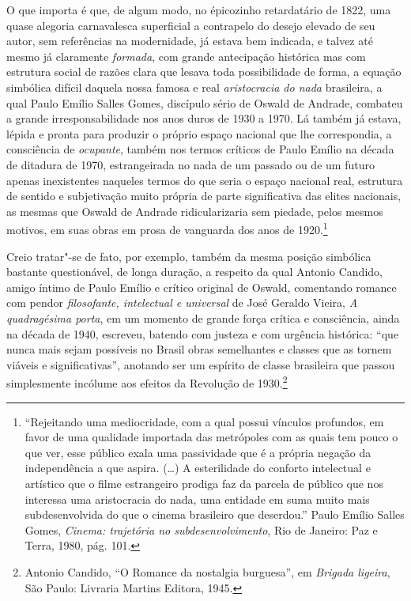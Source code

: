O que importa é que, de algum modo, no épicozinho retardatário de 1822,
uma quase alegoria carnavalesca superficial a contrapelo do desejo
elevado de seu autor, sem referências na modernidade, já estava bem
indicada, e talvez até mesmo já claramente \emph{formada}, com grande
antecipação histórica mas com estrutura social de razões clara que
lesava toda possibilidade de forma, a equação simbólica difícil daquela
nossa famosa e real \emph{aristocracia do nada} brasileira, a qual Paulo
Emílio Salles Gomes, discípulo sério de Oswald de Andrade, combateu a
grande irresponsabilidade nos anos duros de 1930 a 1970. Lá também já
estava, lépida e pronta para produzir o próprio espaço nacional que lhe
correspondia, a consciência de \emph{ocupante}, também nos termos
críticos de Paulo Emílio na década de ditadura de 1970, estrangeirada no
nada de um passado ou de um futuro apenas inexistentes naqueles termos
do que seria o espaço nacional real, estrutura de sentido e subjetivação
muito própria de parte significativa das elites nacionais, as mesmas que
Oswald de Andrade ridicularizaria sem piedade, pelos mesmos motivos, em
suas obras em prosa de vanguarda dos anos de 1920.\footnote{``Rejeitando
  uma mediocridade, com a qual possui vínculos profundos, em favor de
  uma qualidade importada das metrópoles com as quais tem pouco o que
  ver, esse público exala uma passividade que é a própria negação da
  independência a que aspira. (\ldots{}) A esterilidade do conforto
  intelectual e artístico que o filme estrangeiro prodiga faz da parcela
  de público que nos interessa uma aristocracia do nada, uma entidade em
  suma muito mais subdesenvolvida do que o cinema brasileiro que
  deserdou.'' Paulo Emílio Salles Gomes, \emph{Cinema: trajetória no
  subdesenvolvimento}, Rio de Janeiro: Paz e Terra, 1980, pág. 101.}

Creio tratar"-se de fato, por exemplo, também da mesma posição simbólica
bastante questionável, de longa duração, a respeito da qual Antonio
Candido, amigo íntimo de Paulo Emílio e crítico original de Oswald,
comentando romance com pendor \emph{filosofante, intelectual e
universal} de José Geraldo Vieira, \emph{A quadragésima porta}, em um
momento de grande força crítica e consciência, ainda na década de 1940,
escreveu, batendo com justeza e com urgência histórica: ``que nunca mais
sejam possíveis no Brasil obras semelhantes e classes que as tornem
viáveis e significativas'', anotando ser um espírito de classe
brasileira que passou simplesmente incólume aos efeitos da Revolução de
1930.\footnote{Antonio Candido, ``O Romance da nostalgia burguesa'', em
  \emph{Brigada ligeira}, São Paulo: Livraria Martins Editora, 1945.}

